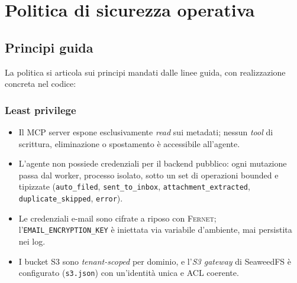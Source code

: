 \documentclass[11pt,a4paper,oneside]{article}
\begin{document}
\section{Politica di sicurezza operativa}
\label{sec:safety}

\subsection{Principi guida}
La politica si articola sui principi mandati dalle linee guida, con
realizzazione concreta nel codice:

\subsubsection{Least privilege}
\begin{itemize}[leftmargin=*]
    \item Il MCP server espone esclusivamente \emph{read} sui metadati;
          nessun \emph{tool} di scrittura, eliminazione o spostamento
          \`e accessibile all'agente.
    \item L'agente non possiede credenziali per il backend pubblico:
          ogni mutazione passa dal worker, processo isolato, sotto un set
          di operazioni bounded e tipizzate (\texttt{auto\_filed},
          \texttt{sent\_to\_inbox}, \texttt{attachment\_extracted},
          \texttt{duplicate\_skipped}, \texttt{error}).
    \item Le credenziali e-mail sono cifrate a riposo con \textsc{Fernet};
          l'\texttt{EMAIL\_ENCRYPTION\_KEY} \`e iniettata via variabile
          d'ambiente, mai persistita nei log.
    \item I bucket S3 sono \emph{tenant-scoped} per dominio, e l'\emph{S3
          gateway} di SeaweedFS \`e configurato (\texttt{s3.json}) con
          un'identit\`a unica e ACL coerente.
\end{itemize}
\end{document}
